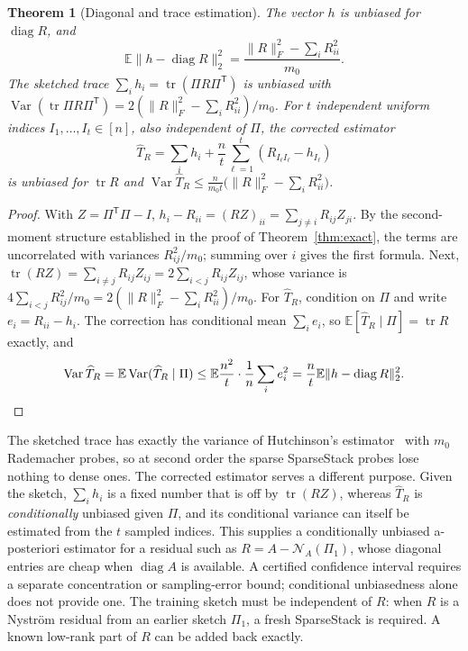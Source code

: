 \documentclass[11pt,a4paper]{article}
\newtheorem{theorem}{Theorem}[section]
\theoremstyle{definition}
\theoremstyle{remark}
\newcommand{\E}{\mathbb E}
\newcommand{\tr}{\operatorname{tr}}
\newcommand{\diag}{\operatorname{diag}}
\newcommand{\norm}[1]{\lVert#1\rVert}
\newcommand{\Nys}{\mathcal N}
\newcommand{\1}{\mathbf 1}
\newcommand{\T}{\mathsf T}
\begin{document}
\begin{theorem}[Diagonal and trace estimation]\label{thm:diag}
The vector $h$ is unbiased for $\diag R$, and
\[
 \E\norm{h-\diag R}_2^2=\frac{\norm R_F^2-\sum_iR_{ii}^2}{m_0}.
\]
The sketched trace $\sum_ih_i=\tr(\Pi R\Pi^\T)$ is unbiased with
$\operatorname{Var}(\tr\Pi R\Pi^\T)=2(\norm R_F^2-\sum_iR_{ii}^2)/m_0$.
For $t$ independent uniform indices $I_1,\ldots,I_t\in[n]$, also
independent of $\Pi$, the corrected estimator
\[
 \widehat T_R=\sum_ih_i+\frac nt\sum_{\ell=1}^t(R_{I_\ell I_\ell}-h_{I_\ell})
\]
is unbiased for $\tr R$ and
$\operatorname{Var}\widehat T_R\le\frac{n}{m_0t}\bigl(\norm R_F^2-\sum_iR_{ii}^2\bigr)$.
\end{theorem}
\begin{proof}
With $Z=\Pi^\T\Pi-I$, $h_i-R_{ii}=(RZ)_{ii}=\sum_{j\ne i}R_{ij}Z_{ji}$. By
the second-moment structure established in the proof of
Theorem~\ref{thm:exact}, the terms are uncorrelated with variances
$R_{ij}^2/m_0$; summing over $i$ gives the first formula. Next,
$\tr(RZ)=\sum_{i\ne j}R_{ij}Z_{ij}=2\sum_{i<j}R_{ij}Z_{ij}$, whose variance
is $4\sum_{i<j}R_{ij}^2/m_0=2(\norm R_F^2-\sum_iR_{ii}^2)/m_0$.
For $\widehat T_R$, condition on $\Pi$ and write $e_i=R_{ii}-h_i$. The
correction has conditional mean $\sum_ie_i$, so
$\E[\widehat T_R\mid\Pi]=\tr R$ exactly, and
\[
 \operatorname{Var}\widehat T_R=\E\operatorname{Var}(\widehat T_R\mid\Pi)
 \le\E\frac{n^2}{t}\cdot\frac1n\sum_ie_i^2=\frac nt\E\norm{h-\diag R}_2^2 .
\qedhere
\]
\end{proof}

The sketched trace has exactly the variance of Hutchinson's
estimator~\cite{Hutchinson1989} with $m_0$ Rademacher probes, so at second order the sparse SparseStack
probes lose nothing to dense ones. The corrected estimator serves a
different purpose. Given the sketch, $\sum_ih_i$ is a fixed number that
is off by $\tr(RZ)$, whereas $\widehat T_R$ is \emph{conditionally}
unbiased given $\Pi$, and its conditional variance can itself be
estimated from the $t$ sampled indices. This supplies a conditionally unbiased
a-posteriori estimator for a residual such as $R=A-\Nys_A(\Pi_1)$,
whose diagonal entries are cheap when $\diag A$ is available. A
certified confidence interval requires a separate concentration or
sampling-error bound; conditional unbiasedness alone does not provide
one. The training
sketch must be independent of $R$: when $R$ is a Nystr\"om residual from
an earlier sketch $\Pi_1$, a fresh SparseStack is required. A known
low-rank part of $R$ can be added back exactly.
\end{document}
